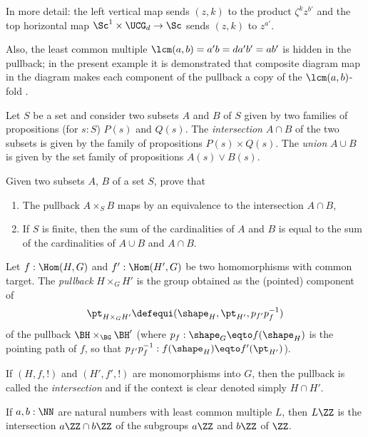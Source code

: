 \begin{example}
  In more detail:
  the left vertical map sends $(z,k)$ to the product $\zeta^k z^{b'}$
  and the top horizontal map $\Sc^1\times \UCG_d \to \Sc$ sends $(z,k)$ to $z^{a'}$.

  Also, the least common multiple $\lcm(a,b)=a'b=da'b'=ab'$ is hidden in the pullback;
  in the present example it is demonstrated that composite diagram map in
  the diagram makes each component of the pullback a copy of the $\lcm(a,b)$-fold \covering.
\end{example}


\begin{definition}
  \label{def:intersectionand unionofsets}
  Let $S$ be a set and consider two subsets $A$ and $B$ of $S$ given by two families of propositions (for $s:S$) $P(s)$ and $Q(s)$.  The \emph{intersection} $A\cap B$ of the two subsets is given by the family of propositions $P(s)\times Q(s)$.  The \emph{union} $A\cup B$ is given by the set family of propositions $A(s)\lor B(s)$.
\end{definition}
\begin{xca}
  \label{xca:intersectionpullbackofsets}
  Given two subsets $A$, $B$ of a set $S$, prove that
  \begin{enumerate}
  \item The pullback $A\times_SB$ maps by an equivalence to the intersection $A\cap B$,
  \item\label{xca:cardinalityintersectionunion}
    If $S$ is finite, then the sum of the cardinalities of $A$ and $B$ is equal to the sum of the cardinalities of $A\cup B$ and $A\cap B$.\qedhere
  \end{enumerate}
\end{xca}

\begin{definition}
  \label{def:intersectionofgroups}
  Let $f:\Hom(H,G)$ and $f':\Hom(H',G)$ be two homomorphisms with common target.  The \emph{pullback} $H\times_GH'$ is the group obtained as the (pointed) component of
  \[
    \pt_{H\times_GH'}\defequi(\shape_H,\pt_{H'},p_{f'}p_f^{-1})
  \]
  of the pullback $\BH\times_{\BG}\BH'$
  (where $p_f:\shape_G\eqto f(\shape_H)$ is the pointing path of $f$,
  so that $p_{f'}p_f^{-1}:f(\shape_H)\eqto f'(\pt_{H'})$).

  If $(H,f,!)$ and $(H',f',!)$ are monomorphisms into $G$,
  then the pullback is called the \emph{intersection} and if the context is clear denoted simply $H\cap H'$.
\end{definition}
\begin{example}
  If $a,b:\NN$ are natural numbers with least common multiple $L$,
  then $L\ZZ$ is the intersection $a\ZZ\cap b\ZZ$ of the subgroups $a\ZZ$ and $b\ZZ$ of $\ZZ$.
\end{example}

